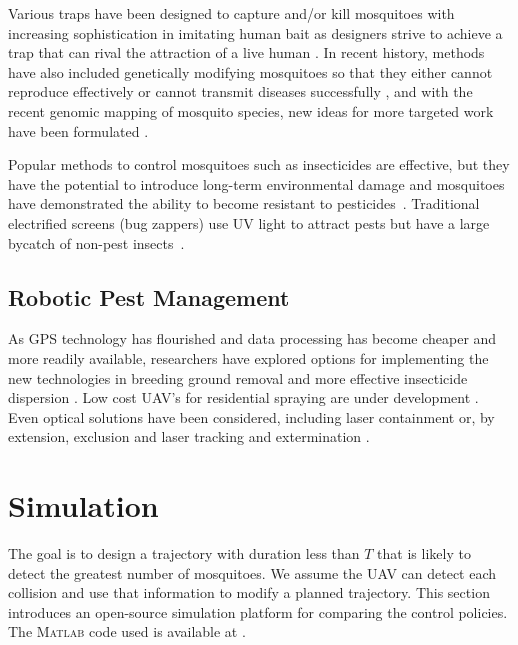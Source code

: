 \documentclass[letterpaper, 10 pt, conference]{ieeeconf}  %
\begin{document}
	Various traps have been designed to capture and/or kill mosquitoes with increasing sophistication in imitating human bait as designers strive to achieve a trap that can rival the attraction of a live human \cite{maliti2015development}.  In recent history, methods have also included genetically modifying mosquitoes so that they either cannot reproduce effectively or cannot transmit diseases successfully \cite{marshall2009malaria}, and with the recent genomic mapping of mosquito species, new ideas for more targeted work have been formulated \cite{hill2005arthropod}.
	
	Popular methods to control mosquitoes such as insecticides are effective, but they have the potential to introduce long-term environmental damage and mosquitoes have demonstrated the ability to become resistant to pesticides~\cite{ndiath2012resistance}. Traditional electrified screens (bug zappers) use UV light to attract pests but have a large bycatch of non-pest insects~\cite{University-Of-Florida1997}. 
	
 
    \subsection{Robotic Pest Management}
    
As GPS technology has flourished and data processing has become cheaper and more readily available, researchers have explored options for implementing the new technologies in breeding ground removal \cite{anupa2014identification} and more effective insecticide dispersion \cite{hur2015low}.  Low cost UAV's for residential spraying are under development \cite{amenyo2014medizdroids}.  Even optical solutions have been considered, including laser containment \cite{boonsri2012laser} or, by extension, exclusion and laser tracking and extermination \cite{kare2010build}.
    
   
    \section{Simulation}\label{sec:Simulation}
     The goal is to design a trajectory with duration less than $T$ that is likely to detect the greatest number of mosquitoes.  
   We assume the UAV can detect each collision and use that information to modify a planned trajectory. 
  This section introduces an open-source simulation platform for comparing the control policies.  The \textsc{Matlab} code used is available at \cite{Burbage2016matlab}. 
    
\end{document}
